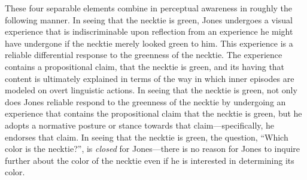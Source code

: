 \documentclass[12pt]{article}
\begin{document}
% 
% 

These four separable elements combine in perceptual awareness in roughly the following manner. In seeing that the necktie is green, Jones undergoes a visual experience that is indiscriminable upon reflection from an experience he might have undergone if the necktie merely looked green to him. This experience is a reliable differential response to the greenness of the necktie. The experience contains a propositional claim, that the necktie is green, and its having that content is ultimately explained in terms of the way in which inner episodes are modeled on overt linguistic actions. In seeing that the necktie is green, not only does Jones reliable respond to the greenness of the necktie by undergoing an experience that contains the propositional claim that the necktie is green, but he adopts a normative posture or stance towards that claim---specifically, he endorses that claim. In seeing that the necktie is green, the question, ``Which color is the necktie?'', is \emph{closed} for Jones---there is no reason for Jones to inquire further about the color of the necktie even if he is interested in determining its color.
\end{document}
